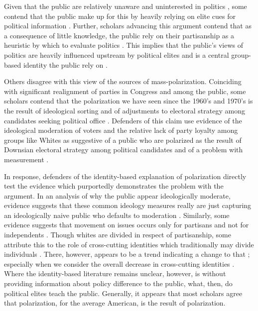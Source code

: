 \documentclass [12pt]{article}
\begin{document}
Given that the public are relatively unaware and uninterested in politics \citep[see][]{berelson_1952, delli-carpini_keeter_1996}, some contend that the public make up for this by heavily relying on elite cues for political information \citep{zaller_1992, zaller_2003}. Further, scholars advancing this argument contend that as a consequence of little knowledge, the public rely on their partisanship as a heuristic by which to evaluate politics \citep{delli-carpini_keeter_1996}. This implies that the public's views of politics are heavily influenced upstream by political elites and is a central group-based identity the public rely on \citep[Chapter 7]{schickler_green_1997,campbell_et-al_1969}. 

Others disagree with this view of the sources of mass-polarization. Coinciding with significant realignment of parties in Congress and among the public, some scholars contend that the polarization we have seen since the 1960's and 1970's is the result of ideological sorting and of adjustments to electoral strategy among candidates seeking political office \citep{fiorina_abrams_2008}. Defenders of this claim use evidence of the ideological moderation of voters and the relative lack of party loyalty among groups like Whites as suggestive of a public who are polarized as the result of Downsian electoral strategy among political candidates and of a problem with measurement \citep{fiorina_et-al_2008}. 

In response, defenders of the identity-based explanation of polarization directly test the evidence which purportedly demonstrates the problem with the argument. In an analysis of why the public appear ideologically moderate, evidence suggests that these common ideology measures really are just capturing an ideologically naive public who defaults to moderation \citep{kinder_kalmoe_2017}. Similarly, some evidence suggests that movement on issues occurs only for partisans and not for independents \citep{layman_carsey_2002}. Though whites are divided in respect of partisanship, some attribute this to the role of cross-cutting identities which traditionally may divide individuals \citep{baldassarri_goldberg_2014}. There, however, appears to be a trend indicating a change to that \citep{sides_et-al_2018}; especially when we consider the overall decrease in cross-cutting identities \citep{mason_2018}. Where the identity-based literature remains unclear, however, is without providing information about policy difference to the public, what, then, do political elites teach the public. Generally, it appears that most scholars agree that polarization, for the average American, is the result of polarization.
\end{document}
